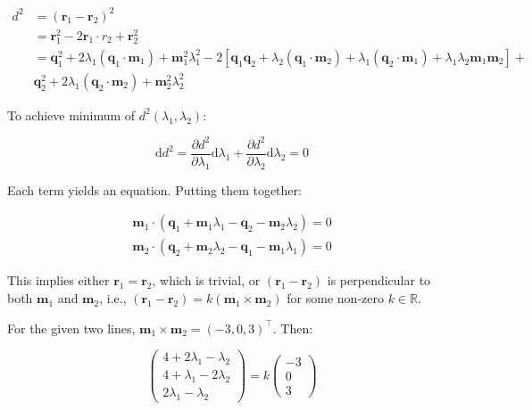\documentclass[12pt]{article}
\begin{document}
\begin{equation}
    \begin{split}
        d^{2} &= (\mathbf{r}_{1} - \mathbf{r}_{2})^{2} \\
        &= \mathbf{r}_{1}^{2} - 2 \mathbf{r}_{1} \cdot r_{2} + \mathbf{r}_{2}^{2} \\
        &= \mathbf{q}_{1}^{2} + 2\lambda_{1} (\mathbf{q}_{1} \cdot \mathbf{m}_{1}) + \mathbf{m}_{1}^{2} \lambda_{1}^{2} - 2 \left[ \mathbf{q}_{1} \mathbf{q}_{2} + \lambda_{2} (\mathbf{q}_{1} \cdot \mathbf{m}_{2}) +\lambda_{1} (\mathbf{q}_{2} \cdot \mathbf{m}_{1}) + \lambda_{1} \lambda_{2} \mathbf{m}_{1} \mathbf{m}_{2} \right] + \\
        &  \mathbf{q}_{2}^{2} + 2\lambda_{1} (\mathbf{q}_{2} \cdot \mathbf{m}_{2}) + \mathbf{m}_{2}^{2} \lambda_{2}^{2}
    \end{split}
\end{equation}

To achieve minimum of $d^{2}(\lambda_{1}, \lambda_{2})$:

\begin{equation}
    \mathrm{d}d^{2} = \frac{\partial d^{2}}{\partial \lambda_{1}} \mathrm{d}\lambda_{1} + \frac{\partial d^{2}}{\partial \lambda_{2}} \mathrm{d}\lambda_{2} = 0
\end{equation}

Each term yields an equation. Putting them together:

\begin{equation}
    \begin{split}
        \mathbf{m}_{1} \cdot (\mathbf{q}_{1} + \mathbf{m}_{1} \lambda_{1} - \mathbf{q}_{2} - \mathbf{m}_{2} \lambda_{2}) = 0 \\
        \mathbf{m}_{2} \cdot (\mathbf{q}_{2} + \mathbf{m}_{2} \lambda_{2} - \mathbf{q}_{1} - \mathbf{m}_{1} \lambda_{1}) = 0
    \end{split}
\end{equation}

This implies either $\mathbf{r}_{1} = \mathbf{r}_{2}$, which is trivial, or $(\mathbf{r}_{1} - \mathbf{r}_{2})$ is perpendicular to both $\mathbf{m}_{1}$ and $\mathbf{m}_{2}$, i.e., $(\mathbf{r}_{1} - \mathbf{r}_{2}) = k(\mathbf{m}_{1} \times \mathbf{m}_{2})$ for some non-zero $k \in \mathbb{R}$.

For the given two lines, $\mathbf{m}_{1} \times \mathbf{m}_{2} = (-3, 0, 3)^{\intercal}$. Then:

\begin{equation}
    \begin{pmatrix}
        4 + 2\lambda_{1} - \lambda_{2} \\
        4 + \lambda_{1} - 2\lambda_{2} \\
        2\lambda_{1} - \lambda_{2}
    \end{pmatrix}
    =
    k\begin{pmatrix}
        -3 \\
        0  \\
        3
    \end{pmatrix}
\end{equation}
\end{document}
